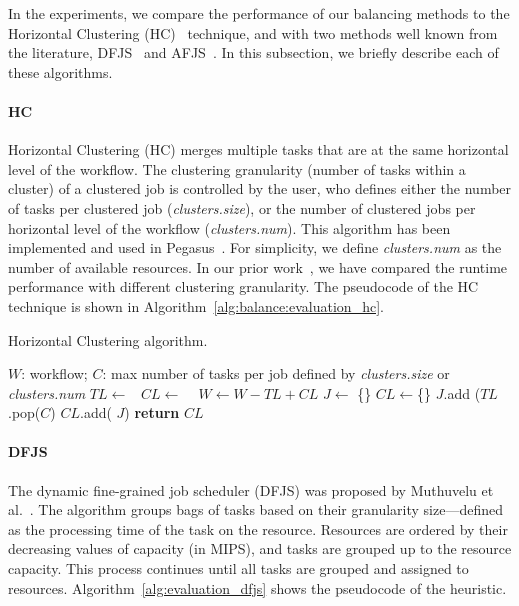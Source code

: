 In the experiments, we compare the performance of our balancing methods to the Horizontal Clustering (HC)~\cite{Singh2008} technique, and with two methods well known from the literature, DFJS~\cite{Muthuvelu2005} and AFJS~\cite{Liu2009}. In this subsection, we briefly describe each of these algorithms.


\paragraph{\textbf{HC}}
Horizontal Clustering (HC) merges multiple tasks that are at the same horizontal level of the workflow. The clustering granularity (number of tasks within a cluster) of a clustered job is controlled by the user, who defines either the number of tasks per clustered job (\emph{clusters.size}), or the number of clustered jobs per horizontal level of the workflow (\emph{clusters.num}). This algorithm has been implemented and used in Pegasus~\cite{Singh2008}. For simplicity, we define \emph{clusters.num} as the number of available resources. In our prior work~\cite{Chen2013b}, we have compared the runtime performance with different clustering granularity. The pseudocode of the HC technique is shown in Algorithm~\ref{alg:balance:evaluation_hc}. 


\begin{algorithm}[!htb]
	\footnotesize
	\caption{Horizontal Clustering algorithm.}
	\label{alg:balance:evaluation_hc}
	\begin{algorithmic}[1]
		\Require $W$: workflow; $C$: max number of tasks per job defined by \emph{clusters.size} or \emph{clusters.num}
				\State $TL\gets $\  
				\State $CL\gets$  \  
				\State $W \gets W - TL + CL$   
			\EndFor
		\EndProcedure
			\State $J\gets$ \{\}
			\State $CL\gets$\{\}
				\State $J$.add ($TL$.pop($C$) 
				\State  $CL$.add( $J$)
			\EndWhile
			\State \textbf{return} $CL$
		\EndProcedure
	\end{algorithmic}
\end{algorithm}

\paragraph{\textbf{DFJS}}
The dynamic fine-grained job scheduler (DFJS) was proposed by Muthuvelu et al.~\cite{Muthuvelu2005}. The algorithm groups bags of tasks based on their granularity size---defined as the processing time of the task on the resource. Resources are ordered by their decreasing values of capacity (in MIPS), and tasks are grouped up to the resource capacity. This process continues until all tasks are grouped and assigned to resources. Algorithm~\ref{alg:evaluation_dfjs} shows the pseudocode of the heuristic. 
 
